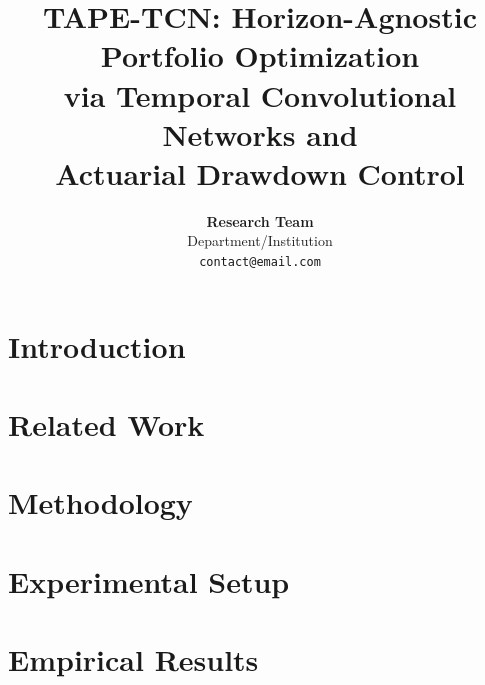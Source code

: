\documentclass[10pt,twocolumn]{article}
\title{
    \Large\textbf{TAPE-TCN: Horizon-Agnostic Portfolio Optimization \\
    via Temporal Convolutional Networks and \\
    Actuarial Drawdown Control}
}
\author{
    \textbf{Research Team} \\
    Department/Institution \\
    \texttt{contact@email.com}
}
\date{}  %
\begin{document}
\twocolumn[
  \begin{@twocolumnfalse}
    \maketitle
    
    \begin{abstract}
        
    \end{abstract}
    
    \vspace{0.5cm}
  \end{@twocolumnfalse}
]


\section{Introduction}
\label{sec:intro}


\section{Related Work}
\label{sec:related}


\section{Methodology}
\label{sec:method}


\section{Experimental Setup}
\label{sec:setup}


\section{Empirical Results}
\label{sec:results}

\end{document}
